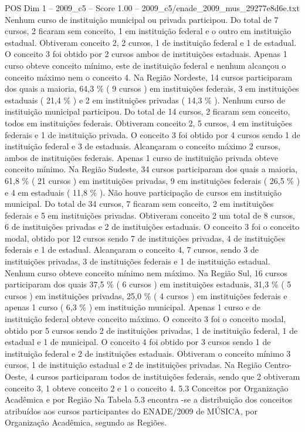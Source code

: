 \begin{textsample}{POS Dim 1 – 2009\_c5 – Score 1.00 – 2009\_c5/enade\_2009\_mus\_29277e8d6e.txt}
Nenhum curso de instituição municipal ou privada participou.
Do total de 7 cursos, 2 ficaram sem conceito, 1 em instituição federal e o outro em instituição estadual.
Obtiveram conceito 2, 2 cursos, 1 de instituição federal e 1 de estadual.
O conceito 3 foi obtido por 2 cursos ambos de instituições estaduais.
Apenas 1 curso obteve conceito mínimo, este de instituição federal e nenhum alcançou o conceito máximo nem o conceito 4.
Na Região Nordeste, 14 cursos participaram dos quais a maioria, 64,3 \% ( 9 cursos ) em instituições federais, 3 em instituições estaduais ( 21,4 \% ) e 2 em instituições privadas ( 14,3 \% ).
Nenhum curso de instituição municipal participou.
Do total de 14 cursos, 2 ficaram sem conceito, todos em instituições federais.
Obtiveram conceito 2, 5 cursos, 4 em instituições federais e 1 de instituição privada.
O conceito 3 foi obtido por 4 cursos sendo 1 de instituição federal e 3 de estaduais.
Alcançaram o conceito máximo 2 cursos, ambos de instituições federais.
Apenas 1 curso de instituição privada obteve conceito mínimo.
Na Região Sudeste, 34 cursos participaram dos quais a maioria, 61,8 \% ( 21 cursos ) em instituições privadas, 9 em instituições federais ( 26,5 \% ) e 4 em estaduais ( 11,8 \% ).
Não houve participação de cursos em instituição municipal.
Do total de 34 cursos, 7 ficaram sem conceito, 2 em instituições federais e 5 em instituições privadas.
Obtiveram conceito 2 um total de 8 cursos, 6 de instituições privadas e 2 de instituições estaduais.
O conceito 3 foi o conceito modal, obtido por 12 cursos sendo 7 de instituições privadas, 4 de instituições federais e 1 de estadual.
Alcançaram o conceito 4, 7 cursos, sendo 3 de instituições privadas, 3 de instituições federais e 1 de instituição estadual.
Nenhum curso obteve conceito mínimo nem máximo.
Na Região Sul, 16 cursos participaram dos quais 37,5 \% ( 6 cursos ) em instituições estaduais, 31,3 \% ( 5 cursos ) em instituições privadas, 25,0 \% ( 4 cursos ) em instituições federais e apenas 1 curso ( 6,3 \% ) em instituição municipal.
Apenas 1 curso e de instituição federal obteve conceito máximo.
O conceito 3 foi o conceito modal, obtido por 5 cursos sendo 2 de instituições privadas, 1 de instituição federal, 1 de estadual e 1 de municipal.
O conceito 4 foi obtido por 3 cursos sendo 1 de instituição federal e 2 de instituições estaduais.
Obtiveram o conceito mínimo 3 cursos, 1 de instituição estadual e 2 de instituições privadas.
Na Região Centro-Oeste, 4 cursos participaram todos de instituições federais, sendo que 2 obtiveram conceito 3, 1 obteve conceito 2 e 1 o conceito 4. 5.3 Conceitos por Organização Acadêmica e por Região Na Tabela 5.3 encontra -se a distribuição dos conceitos atribuídos aos cursos participantes do ENADE/2009 de MÚSICA, por Organização Acadêmica, segundo as Regiões.

\end{textsample}
